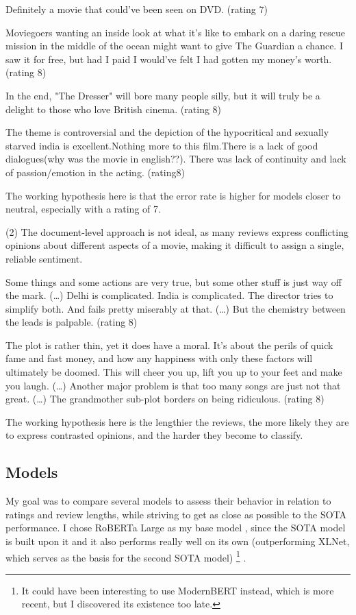 \documentclass{article}
\begin{document}
\begin{displayquote}
Definitely a movie that could've been seen on DVD. (rating 7)

Moviegoers wanting an inside look at what it's like to embark on a daring rescue mission in the middle of the ocean might want to give The Guardian a chance. I saw it for free, but had I paid I would've felt I had gotten my money's worth. (rating 8)

In the end, "The Dresser" will bore many people silly, but it will truly be a delight to those who love British cinema. (rating 8)

The theme is controversial and the depiction of the hypocritical and sexually starved india is excellent.Nothing more to this film.There is a lack of good dialogues(why was the movie in english??). There was lack of continuity and lack of passion/emotion in the acting. (rating8)
\end{displayquote}
The working hypothesis here is that the error rate is higher for models closer to neutral, especially with a rating of 7.

(2) The document-level approach is not ideal, as many reviews express conflicting opinions about different aspects of a movie, making it difficult to assign a single, reliable sentiment.

\begin{displayquote}
Some things and some actions are very true, but some other stuff is just way off the mark. (…) Delhi is complicated. India is complicated. The director tries to simplify both. And fails pretty miserably at that. (…) But the chemistry between the leads is palpable. (rating 8)

The plot is rather thin, yet it does have a moral. It's about the perils of quick fame and fast money, and how any happiness with only these factors will ultimately be doomed. This will cheer you up, lift you up to your feet and make you laugh. (…) Another major problem is that too many songs are just not that great. (…) The grandmother sub-plot borders on being ridiculous. (rating 8)
\end{displayquote}
The working hypothesis here is the lengthier the reviews, the more likely they are to express contrasted opinions, and the harder they become to classify.

\subsection{Models}

My goal was to compare several models to assess their behavior in relation to ratings and review lengths, while striving to get as close as possible to the SOTA performance. I chose RoBERTa Large \citep{liu_roberta_2019} as my base model , since the SOTA model is built upon it and it also performs really well on its own (outperforming XLNet, which serves as the basis for the second SOTA model) 
\footnote{It could have been interesting to use ModernBERT \citep{warner_smarter_2024} instead, which is more recent, but I discovered its existence too late.}
.
\end{document}
